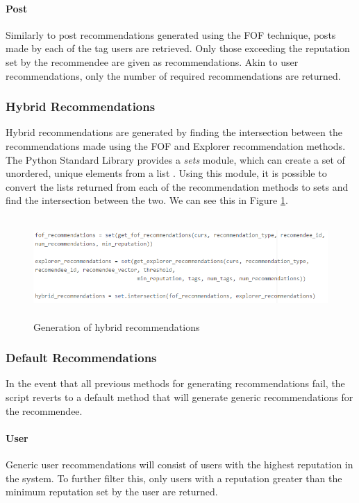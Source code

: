 \paragraph{Post} Similarly to post recommendations generated using the FOF technique, posts made by each of the tag users are retrieved. Only those exceeding the reputation set by the recommendee are given as recommendations. Akin to user recommendations, only the number of required recommendations are returned.

\subsubsection{Hybrid Recommendations}
Hybrid recommendations are generated by finding the intersection between the recommendations made using the FOF and Explorer recommendation methods. The Python Standard Library provides a \textit{sets} module, which can create a set of unordered, unique elements from a list \cite{Python:Sets}. Using this module, it is possible to convert the lists returned from each of the recommendation methods to sets and find the intersection between the two. We can see this in Figure \ref{fig:HybridRecommendations}.

\begin{figure}[H]
\centering
\includegraphics[height=1.5in]{Images/Implementation/HybridRecommendations}
\caption{Generation of hybrid recommendations}
\label{fig:HybridRecommendations}
\end{figure}

\subsubsection{Default Recommendations}
In the event that all previous methods for generating recommendations fail, the script reverts to a default method that will generate generic recommendations for the recommendee. 

\paragraph{User} Generic user recommendations will consist of users with the highest reputation in the system. To further filter this, only users with a reputation greater than the minimum reputation set by the user are returned.

